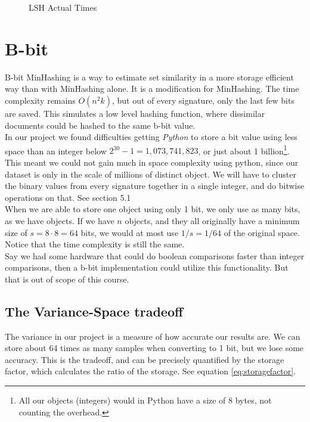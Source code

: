 \documentclass[a4paper,11pt]{article}
\begin{document}
\begin{figure}[H]
    \begin{center}
        
        \caption{LSH Actual Times}
        \label{fig:lsh_at}
    \end{center}
\end{figure}

\section{B-bit}
B-bit MinHashing is a way to estimate set similarity in a more storage efficient way than with MinHashing alone. It is a modification for MinHashing. The time complexity remains $O(n^2k)$, but out of every signature, only the last few bits are saved. This simulates a low level hashing function, where dissimilar documents could be hashed to the same b-bit value. \\

In our project we found difficulties getting \emph{Python} to store a bit value using less space than an integer below $2^{30}-1 = 1,073,741,823$, or just about 1 billion\footnote{All our objects (integers) would in Python have a size of 8 bytes, not counting the overhead.}. This meant we could not gain much in space complexity using python, since our dataset is only in the scale of millions of distinct object. We will have to cluster the binary values from every signature together in a single integer, and do bitwise operations on that. See \cite{article:bbit} section 5.1  \\

When we are able to store one object using only 1 bit, we only use as many bits, as we have objects. If we have $n$ objects, and they all originally have a minimum size of $s = 8 \cdot 8 = 64$ bits, we would at most use $1/s = 1/64$ of the original space. Notice that the time complexity is still the same. \\

Say we had some hardware that could do boolean comparisons faster than integer comparisons, then a b-bit implementation could utilize this functionality. But that is out of scope of this course. \\


\subsection{The Variance-Space tradeoff}
The variance in our project is a measure of how accurate our results are. We can store about 64 times as many samples when converting to 1 bit, but we lose some accuracy. This is the tradeoff, and can be precisely quantified by the storage factor, which calculates the ratio of the  storage. See equation \ref{eq:storagefactor}.
\end{document}
